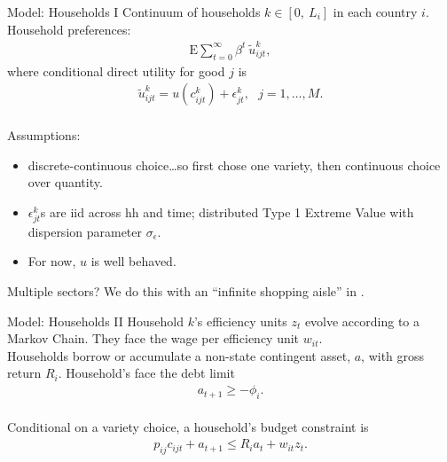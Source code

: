 \documentclass[9pt,pdftex,aspectratio=1610]{beamer}
\theoremstyle{definition}
\begin{document}
\begin{frame}[t]{Model: Households I}
\smallskip
Continuum of households $k \in [0, \ L_i]$ in each country $i$. Household preferences:
\begin{align*}
\mathrm{E}\sum_{t = 0}^{\infty} \beta^{t} \ \tilde{u}^k_{ijt},
\end{align*}
where conditional direct utility for good $j$ is
\begin{align*}
\tilde{u}^k_{ijt} =  u(c^k_{ijt}) + \epsilon^k_{jt}, \ \ \ j = 1, \ldots, M.
\end{align*}\\
\medskip
Assumptions:
\begin{itemize}
\item discrete-continuous choice\ldots so first chose one variety, then continuous choice over quantity.
\smallskip
\item $\epsilon^k_{jt}$s are iid across hh and time; distributed Type 1 Extreme Value with dispersion parameter $\sigma_{\epsilon}$.
\smallskip
\item For now, $u$ is well behaved.
\end{itemize}
\bigskip
Multiple sectors? We do this with an ``infinite shopping aisle'' in \citet{p-iq}.
\end{frame}


\begin{frame}[t]{Model: Households II}
\smallskip
Household $k$'s efficiency units $z_t$ evolve according to a Markov Chain. They face the wage per efficiency unit $w_{it}$.\\
\bigskip
\medskip
Households borrow or accumulate a non-state contingent asset, $a$, with gross return $R_{i}$. Household's face the debt limit
\begin{align*}
a_{t+1} \geq - \phi_{i}.
\end{align*}\\
\bigskip
\medskip
Conditional on a variety choice, a household's budget constraint is
\begin{align*}
p_{ij}c_{ijt} +  a_{t+1} \leq    R_{i} a_{t} + w_{it} z_{t}.
\end{align*}
\end{frame}

\end{document}
